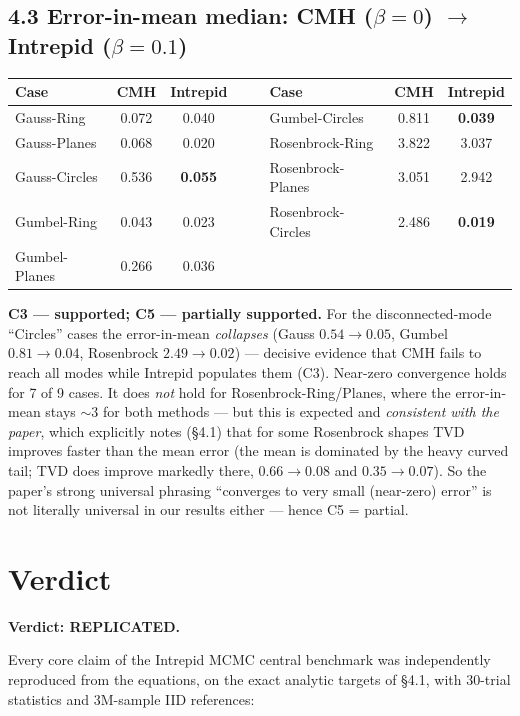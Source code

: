 \documentclass[11pt]{article}
\begin{document}
\subsection*{4.3 Error-in-mean median: CMH ($\beta{=}0$) $\to$ Intrepid ($\beta{=}0.1$)}

\begin{center}
\small
\begin{tabular}{lccc c lcc}
\toprule
Case & CMH & Intrepid & & & Case & CMH & Intrepid \\
\midrule
Gauss-Ring     & 0.072 & 0.040 & & & Gumbel-Circles     & 0.811 & \textbf{0.039} \\
Gauss-Planes   & 0.068 & 0.020 & & & Rosenbrock-Ring    & 3.822 & 3.037 \\
Gauss-Circles  & 0.536 & \textbf{0.055} & & & Rosenbrock-Planes  & 3.051 & 2.942 \\
Gumbel-Ring    & 0.043 & 0.023 & & & Rosenbrock-Circles & 2.486 & \textbf{0.019} \\
Gumbel-Planes  & 0.266 & 0.036 & & & & & \\
\bottomrule
\end{tabular}
\end{center}

\textbf{C3 --- supported; C5 --- partially supported.} For the
disconnected-mode ``Circles'' cases the error-in-mean \emph{collapses}
(Gauss $0.54 \to 0.05$, Gumbel $0.81 \to 0.04$, Rosenbrock $2.49 \to 0.02$)
--- decisive evidence that CMH fails to reach all modes while Intrepid
populates them (C3). Near-zero convergence holds for 7 of 9 cases. It does
\emph{not} hold for Rosenbrock-Ring/Planes, where the error-in-mean stays
$\sim 3$ for both methods --- but this is expected and \emph{consistent with
the paper}, which explicitly notes (\S4.1) that for some Rosenbrock shapes
TVD improves faster than the mean error (the mean is dominated by the heavy
curved tail; TVD does improve markedly there, $0.66 \to 0.08$ and
$0.35 \to 0.07$). So the paper's strong universal phrasing ``converges to
very small (near-zero) error'' is not literally universal in our results
either --- hence C5 = partial.

\section{Verdict}

\textbf{Verdict: REPLICATED.}

Every core claim of the Intrepid MCMC central benchmark was independently
reproduced from the equations, on the exact analytic targets of \S4.1, with
30-trial statistics and 3M-sample IID references:
\end{document}
